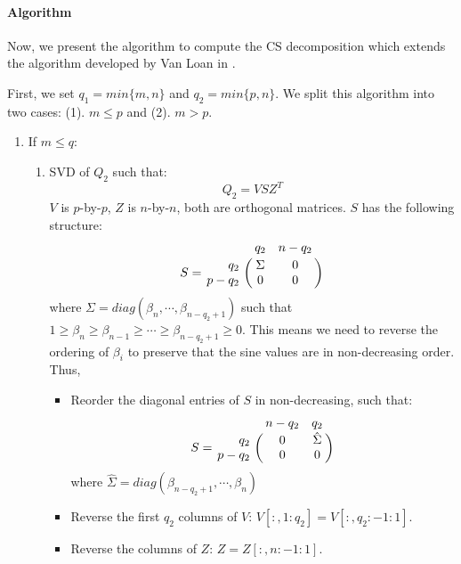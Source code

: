     
    \paragraph{Algorithm} Now, we present the algorithm to compute the CS decomposition which extends the algorithm developed by Van Loan in \cite{vanloan85}.    
    
    First, we set $q_1 = min\{m, n\}$ and $q_2 = min\{p, n\}$. We split this algorithm into two cases: (1). $m \leq p$ and (2). $m > p$.
    
    \begin{enumerate}
        \item If $m \leq q$:
            \begin{enumerate}
                \item SVD of $Q_2$ such that:
                    \begin{equation}
                        Q_2 = VSZ^{T}
                    \end{equation}
                    $V$ is $p$-by-$p$, $Z$ is $n$-by-$n$, both are orthogonal matrices. $S$ has the following structure:
                    \begin{displaymath}
                        S = \bordermatrix{ & q_2 & n-q_2 \cr
                            \hfill q_2 & \Sigma & 0 \cr
                            \hfill p-q_2 & 0 & 0}
                    \end{displaymath}
                    where $\Sigma = diag(\beta_n, \cdots, \beta_{n-q_2+1})$ such that $1 \geq \beta_n \geq \beta_{n-1} \geq \cdots \geq \beta_{n-q_2+1} \geq 0$. This means we need to reverse the ordering of $\beta_{i}$ to preserve that the sine values are in non-decreasing order. Thus,
                    \begin{itemize}
                        \item Reorder the diagonal entries of $S$ in non-decreasing, such that:
                        \begin{displaymath}
                            S = \bordermatrix{ & n-q_2 & q_2 \cr
                                \hfill q_2 & 0 & \hat{\Sigma} \cr
                                \hfill p-q_2 & 0 & 0}
                        \end{displaymath} where $\hat{\Sigma} = diag(\beta_{n-q_2+1}, \cdots, \beta_{n})$
                        \item Reverse the first $q_2$ columns of $V$: $V[:,1:q_2] = V[:,q_2:-1:1]$. 
                        \item Reverse the columns of $Z$: $Z = Z[:,n:-1:1]$. 
                    \end{itemize}
                    

\end{enumerate}
\end{enumerate}
